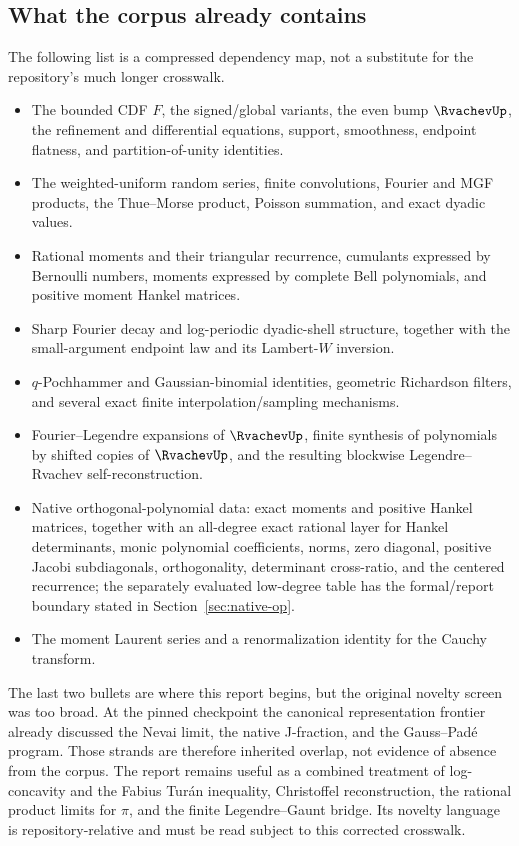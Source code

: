 \documentclass[11pt,oneside]{article}
\theoremstyle{definition}
\theoremstyle{remark}
\numberwithin{equation}{section}
\begin{document}
\subsection{What the corpus already contains}
The following list is a compressed dependency map, not a substitute for the
repository's much longer crosswalk.
\begin{itemize}
\item The bounded CDF $F$, the signed/global variants, the even bump $\RvachevUp$, the
      refinement and differential equations, support, smoothness, endpoint
      flatness, and partition-of-unity identities.
\item The weighted-uniform random series, finite convolutions, Fourier and MGF
      products, the Thue--Morse product, Poisson summation, and exact dyadic
      values.
\item Rational moments and their triangular recurrence, cumulants expressed by
      Bernoulli numbers, moments expressed by complete Bell polynomials, and
      positive moment Hankel matrices.
\item Sharp Fourier decay and log-periodic dyadic-shell structure, together
      with the small-argument endpoint law and its Lambert-$W$ inversion.
\item $q$-Pochhammer and Gaussian-binomial identities, geometric Richardson
      filters, and several exact finite interpolation/sampling mechanisms.
\item Fourier--Legendre expansions of $\RvachevUp$, finite synthesis of polynomials by
      shifted copies of $\RvachevUp$, and the resulting blockwise Legendre--Rvachev
      self-reconstruction.
\item Native orthogonal-polynomial data: exact moments and positive Hankel
      matrices, together with an all-degree exact rational layer for Hankel
      determinants, monic polynomial coefficients, norms, zero diagonal,
      positive Jacobi subdiagonals, orthogonality, determinant cross-ratio, and
      the centered recurrence; the separately evaluated low-degree table has
      the formal/report boundary stated in Section~\ref{sec:native-op}.
\item The moment Laurent series and a renormalization identity for the Cauchy
      transform.
\end{itemize}
The last two bullets are where this report begins, but the original novelty
screen was too broad.  At the pinned checkpoint the canonical representation
frontier already discussed the Nevai limit, the native J-fraction, and the
Gauss--Pad\'e program.  Those strands are therefore inherited overlap, not
evidence of absence from the corpus.  The report remains useful as a combined
treatment of log-concavity and the Fabius Tur\'an inequality, Christoffel
reconstruction, the rational product limits for \(\pi\), and the finite
Legendre--Gaunt bridge.  Its novelty language is repository-relative and must
be read subject to this corrected crosswalk.
\end{document}

